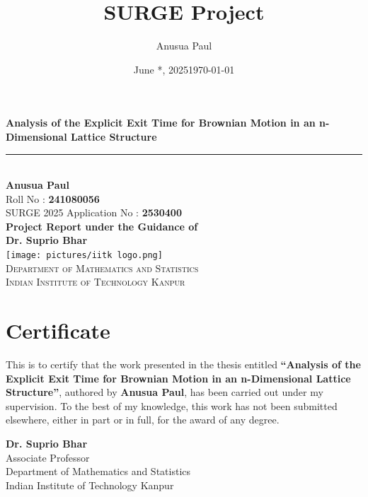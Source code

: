 \documentclass[11pt, a4paper, oneside]{report}
\title{SURGE Project}
\author{Anusua Paul}
\date{June *, 2025}
\title{\ttitle}
\author{\authornames}
\date{\today}
\numberwithin{equation}{section}
\newcommand{\ttitle}{Analysis of the Explicit Exit Time for Brownian Motion in an 
n-Dimensional Lattice Structure}
\newcommand{\authornames}{Anusua Paul}
\newcommand{\supnameA}{Dr. Suprio Bhar}
\newcommand{\univname}{Indian Institute of Technology Kanpur}
\newcommand{\deptname}{Department of Mathematics and Statistics}
\begin{document}
\begin{titlepage}
\begin{center}
    \vspace*{0.5cm}
    
    {\Huge \bfseries \ttitle}\\[0.4cm]
    \rule{0.8\linewidth}{0.8pt} \\[1.2cm]

    
    {\large \textbf{Anusua Paul}}\\[0.1cm]
    Roll No : \textbf{241080056}\\
    SURGE 2025 Application No : \textbf{2530400}\\[1.5cm]

    {\normalsize \textbf{Project Report under the Guidance of}}\\[0.1cm]
    {\normalsize \textbf{Dr. Suprio Bhar}}\\[2cm]

    \texttt{[image: pictures/iitk logo.png]}\\[1cm]

    {\Large \textsc{\deptname}}\\[0.2cm]
    {\Large \textsc{\univname}}\\[2cm]

   

\end{center}
\end{titlepage}


\chapter*{Certificate}

\noindent
This is to certify that the work presented in the thesis entitled \textbf{\enquote{\ttitle}}, authored by \textbf{\authornames}, has been carried out under my supervision. To the best of my knowledge, this work has not been submitted elsewhere, either in part or in full, for the award of any degree.


\vspace{2cm}

\noindent
\begin{minipage}{0.6\textwidth}
\textbf{\supnameA} \\
Associate Professor\\
\deptname\\
\univname
\end{minipage}
\end{document}
